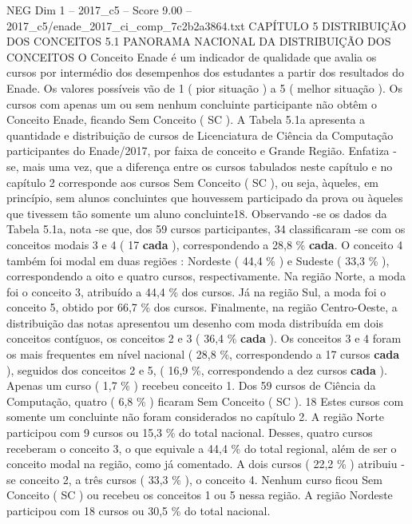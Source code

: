 \begin{textsample}{NEG Dim 1 – 2017\_c5 – Score 9.00 – 2017\_c5/enade\_2017\_ci\_comp\_7c2b2a3864.txt}  \label{ex:f1_neg_381}
CAPÍTULO 5 DISTRIBUIÇÃO DOS CONCEITOS 5.1 PANORAMA NACIONAL DA DISTRIBUIÇÃO DOS CONCEITOS O Conceito Enade é um indicador de qualidade que avalia os cursos por intermédio dos desempenhos dos estudantes a partir dos resultados do Enade.
Os valores possíveis vão de 1 ( pior situação ) a 5 ( melhor situação ).
Os cursos com apenas um ou sem nenhum concluinte participante não obtêm o Conceito Enade, ficando Sem Conceito ( SC ).
A Tabela 5.1a apresenta a quantidade e distribuição de cursos de Licenciatura de Ciência da Computação participantes do Enade/2017, por faixa de conceito e Grande Região.
Enfatiza -se, mais uma vez, que a diferença entre os cursos tabulados neste capítulo e no capítulo 2 corresponde aos cursos Sem Conceito ( SC ), ou seja, àqueles, em princípio, sem alunos concluintes que houvessem participado da prova ou àqueles que tivessem tão somente um aluno concluinte18.
Observando -se os dados da Tabela 5.1a, nota -se que, dos 59 cursos participantes, 34 classificaram -se com os conceitos modais 3 e 4 ( 17 \textbf{cada} ), correspondendo a 28,8 \% \textbf{cada}.
O conceito 4 também foi modal em duas regiões : Nordeste ( 44,4 \% ) e Sudeste ( 33,3 \% ), correspondendo a oito e quatro cursos, respectivamente.
Na região Norte, a moda foi o conceito 3, atribuído a 44,4 \% dos cursos.
Já na região Sul, a moda foi o conceito 5, obtido por 66,7 \% dos cursos.
Finalmente, na região Centro-Oeste, a distribuição das notas apresentou um desenho com moda distribuída em dois conceitos contíguos, os conceitos 2 e 3 ( 36,4 \% \textbf{cada} ).
Os conceitos 3 e 4 foram os mais frequentes em nível nacional ( 28,8 \%, correspondendo a 17 cursos \textbf{cada} ), seguidos dos conceitos 2 e 5, ( 16,9 \%, correspondendo a dez cursos \textbf{cada} ).
Apenas um curso ( 1,7 \% ) recebeu conceito 1.
Dos 59 cursos de Ciência da Computação, quatro ( 6,8 \% ) ficaram Sem Conceito ( SC ). 18 Estes cursos com somente um concluinte não foram considerados no capítulo 2.
A região Norte participou com 9 cursos ou 15,3 \% do total nacional.
Desses, quatro cursos receberam o conceito 3, o que equivale a 44,4 \% do total regional, além de ser o conceito modal na região, como já comentado.
A dois cursos ( 22,2 \% ) atribuiu -se conceito 2, a três cursos ( 33,3 \% ), o conceito 4.
Nenhum curso ficou Sem Conceito ( SC ) ou recebeu os conceitos 1 ou 5 nessa região.
A região Nordeste participou com 18 cursos ou 30,5 \% do total nacional.

\end{textsample}
